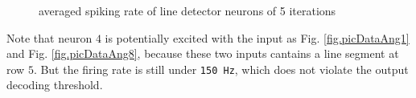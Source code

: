 \documentclass[11pt]{article}
\begin{document}
    \begin{figure}[htbp]
    \centering
        \caption{averaged spiking rate of line detector neurons of 5 iterations}
        \label{fig.lineRate}
    \end{figure}
    
    Note that neuron $4$ is potentially excited with the input as Fig. \ref{fig.picDataAng1} and Fig. \ref{fig.picDataAng8}, because these two inputs cantains a line segment at row $5$. But the firing rate is still under \texttt{150 Hz}, which does not violate the output decoding threshold.

	
    
\end{document}
